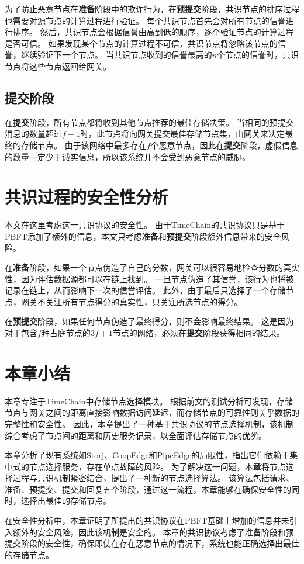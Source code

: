 为了防止恶意节点在\textbf{准备}阶段中的欺诈行为，在\textbf{预提交}阶段，共识节点的排序过程也需要对源节点的计算过程进行验证。
每个共识节点首先会对所有节点的信誉进行排序。
然后，共识节点会根据信誉由高到低的顺序，逐个验证节点的计算过程是否可信。
如果发现某个节点的计算过程不可信，共识节点将忽略该节点的信誉，继续验证下一个节点。
当共识节点收到的信誉最高的$n$个节点的信誉时，共识节点将这些节点返回给网关。

\subsection{提交阶段}
在\textbf{提交}阶段，所有节点都将收到其他节点推荐的最佳存储决策。
当相同的预提交消息的数量超过$f+1$时，此节点将向网关提交最佳存储节点集，由网关来决定最终的存储节点。
由于该网络中最多存在$f$个恶意节点，因此在\textbf{提交}阶段，虚假信息的数量一定少于诚实信息，所以该系统并不会受到恶意节点的威胁。

\section{共识过程的安全性分析}
本文在这里考虑这一共识协议的安全性。
由于TimeChain的共识协议只是基于PBFT添加了额外的信息，本文只考虑\textbf{准备}和\textbf{预提交}阶段额外信息带来的安全风险。

在\textbf{准备}阶段，如果一个节点伪造了自己的分数，网关可以很容易地检查分数的真实性，因为评估数据源都可以在链上找到。
一旦节点伪造了其信誉，该行为也将被记录在链上，从而影响下一次的信誉评估。
此外，由于最后只选择了一个存储节点，网关不关注所有节点得分的真实性，只关注所选节点的得分。

在\textbf{预提交}阶段，如果任何节点伪造了最终得分，则不会影响最终结果。
这是因为对于包含$f$拜占庭节点的$3f+1$节点的网络，必须在\textbf{提交}阶段获得相同的结果。

\section{本章小结}
本章专注于TimeChain中存储节点选择模块。
根据前文的测试分析可发现，存储节点与网关之间的距离直接影响数据访问延迟，而存储节点的可靠性则关乎数据的完整性和安全性。
因此，本章提出了一种基于共识协议的节点选择机制，该机制综合考虑了节点间的距离和历史服务记录，以全面评估存储节点的优劣。

本章分析了现有系统如Storj、CoopEdge和PipeEdge的局限性，指出它们依赖于集中式的节点选择服务，存在单点故障的风险。
为了解决这一问题，本章将节点选择过程与共识机制紧密结合，提出了一种新的节点选择算法。
该算法包括请求、准备、预提交、提交和回复五个阶段，通过这一流程，本章能够在确保安全性的同时，选择出最佳的存储节点。

在安全性分析中，本章证明了所提出的共识协议在PBFT基础上增加的信息并未引入额外的安全风险，因此该机制是安全的。
本章的共识协议考虑了准备阶段和预提交阶段的安全性，确保即使在存在恶意节点的情况下，系统也能正确选择出最佳的存储节点。

